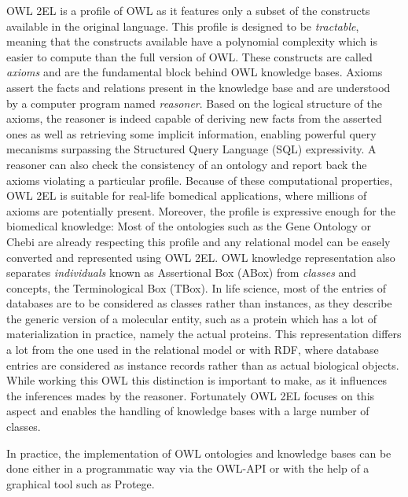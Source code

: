 \documentclass{bioinfo}
\begin{document}
OWL 2EL is a profile of OWL as it features only a subset of the constructs available in the original language. This profile is
designed to be \emph{tractable}, meaning that the constructs available have a polynomial complexity which is easier to compute than the full 
version of OWL. These constructs are called \emph{axioms} and are the fundamental block behind OWL knowledge bases. 
Axioms assert the facts and relations present in the knowledge base and are understood by a computer program named \emph{reasoner}. 
Based on the logical structure of the axioms, the reasoner is indeed capable of deriving new facts from the asserted ones as well as retrieving
some implicit information, enabling powerful query mecanisms surpassing the Structured Query Language (SQL) expressivity. 
A reasoner can also check the consistency of an ontology and report back the axioms violating a particular profile. Because of 
these computational properties, OWL 2EL is suitable for real-life bomedical applications, where millions of axioms are potentially present.
Moreover, the profile is expressive enough for the biomedical knowledge: Most of the ontologies such as the Gene Ontology or Chebi
are already respecting this profile and any relational model can be easely converted and represented using OWL 2EL. OWL knowledge representation
also separates \emph{individuals} known as Assertional Box (ABox) from \emph{classes} and concepts, the Terminological Box (TBox). In life
science, most of the entries of databases are to be considered as classes rather than instances, as they describe the generic version of
a molecular entity, such as a protein which has a lot of materialization in practice, namely the actual proteins. 
This representation differs a lot from the one used in the relational model or with RDF, where database entries are considered as instance 
records rather than as actual biological objects.
While working this OWL this distinction is important to make, as it influences the inferences mades by the reasoner. Fortunately OWL 2EL focuses
on this aspect and enables the handling of knowledge bases with a large number of classes.

In practice, the implementation of OWL ontologies and knowledge bases can be done either in a programmatic way via the OWL-API or with the
help of a graphical tool such as Protege.
\end{document}
